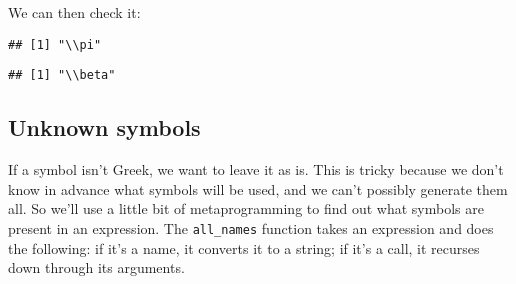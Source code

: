 We can then check it:

\begin{Shaded}
\begin{Highlighting}[]
\StringTok{ }
\NormalTok{\}}

\end{Highlighting}
\end{Shaded}

\begin{verbatim}
## [1] "\\pi"
\end{verbatim}

\begin{Shaded}
\begin{Highlighting}[]
\end{Highlighting}
\end{Shaded}

\begin{verbatim}
## [1] "\\beta"
\end{verbatim}

\hypertarget{unknown-symbols}{%
\subsection{Unknown symbols}\label{unknown-symbols}}

If a symbol isn't Greek, we want to leave it as is. This is tricky
because we don't know in advance what symbols will be used, and we can't
possibly generate them all. So we'll use a little bit of metaprogramming
to find out what symbols are present in an expression. The
\texttt{all\_names} function takes an expression and does the following:
if it's a name, it converts it to a string; if it's a call, it recurses
down through its arguments.


